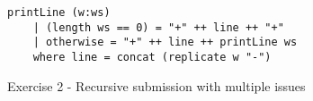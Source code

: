 
\begin{figure}
\begin{verbatim}
printLine (w:ws)
    | (length ws == 0) = "+" ++ line ++ "+"
    | otherwise = "+" ++ line ++ printLine ws
    where line = concat (replicate w "-")
\end{verbatim}
\caption{Exercise 2 - Recursive submission with multiple issues}
\label{fig:ex2-reimplementation-map-guards}
\end{figure}









